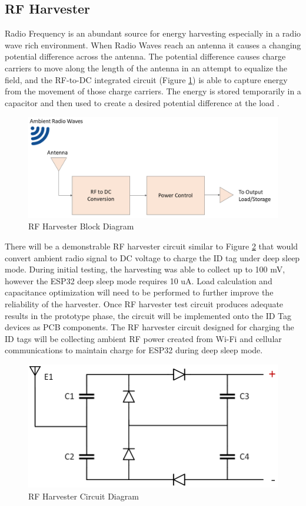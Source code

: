 \pagebreak
\subsection{RF Harvester}
\medskip
Radio Frequency is an abundant source for energy harvesting especially in a radio wave rich environment. When Radio Waves reach an antenna it causes a changing potential difference across the antenna. The potential difference causes charge carriers to move along the length of the antenna in an attempt to equalize the field, and the RF-to-DC integrated circuit (Figure \ref{rf_bd}) is able to capture energy from the movement of those charge carriers. The energy is stored temporarily in a capacitor and then used to create a desired potential difference at the load \cite{R5-2-1}.

\medskip
\begin{figure}[H]
\centering
    \includegraphics[scale=0.55]{./images/RF_H.png}
    \caption{RF Harvester Block Diagram}
    \label{rf_bd}
\end{figure}

There will be a demonstrable RF harvester circuit similar to Figure \ref{rf_c} that would convert ambient radio signal to DC voltage to charge the ID tag under deep sleep mode. During initial testing, the harvesting was able to collect up to 100 mV, however the ESP32 deep sleep mode requires 10 uA. Load calculation and capacitance optimization will need to be performed to further improve the reliability of the harvester. Once RF harvester test circuit produces adequate results in the prototype phase, the circuit will be implemented onto the ID Tag devices as PCB components. The RF harvester circuit designed for charging the ID tags will be collecting ambient RF power created from Wi-Fi and cellular communications to maintain charge for ESP32 during deep sleep mode.

\medskip
\begin{figure}[H]
\centering
    \includegraphics[scale=0.5]{./images/rf_circuit.png}
    \caption{RF Harvester Circuit Diagram}
    \label{rf_c}
\end{figure}

